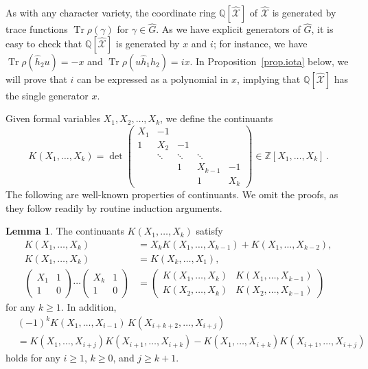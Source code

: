 \documentclass{amsart}
\newcommand{\Q}{\mathbb{Q}}
\newcommand{\Z}{\mathbb{Z}}
\newcommand{\calX}{\mathcal{X}}
\DeclareMathOperator{\Tr}{Tr}
\theoremstyle{definition}
\newtheorem{Lemma}[Theorem]{Lemma}
\begin{document}
As with any character variety, the coordinate ring $\Q[\hat{\calX}]$ of $\hat{\calX}$ is generated by trace functions $\Tr \rho(\gamma)$ for $\gamma\in \hat{G}$. As we have explicit generators of $\hat{G}$, it is easy to check that $\Q[\hat{\calX}]$ is generated by $x$ and $i$; for instance, we have
$\Tr \rho(\hat h_2 u) = -x$ and $\Tr \rho(u \hat h_1\hat h_2) = ix$.
In Proposition~\ref{prop.iota} below, we will prove that $i$ can be expressed as a polynomial in $x$, implying that $\Q[\hat{\calX}]$ has the single generator $x$.

Given formal variables $X_1,X_2,\ldots,X_k$, we define the continuants
\begin{equation*}
K(X_1,\ldots,X_k)=
\det
\begin{pmatrix}
X_1 & -1 &  & & \\
1   & X_2&-1& & \\
    &  \ddots  & \ddots &\ddots &  \\  
    &   & 1&X_{k-1}&-1 \\
    &    &  &1&X_k
\end{pmatrix}  \in \Z[X_1,\ldots,X_k]\,.
\end{equation*}
The following are well-known properties of continuants. We omit the proofs, as they follow readily by routine induction arguments.
\begin{Lemma} 
\label{lem.K}
The continuants $K(X_1,\ldots,X_k)$ satisfy
\begin{align}
     \label{eqn.recursion} K(X_1,\ldots,X_k)&=X_k K(X_1,\ldots,X_{k-1})+K(X_1,\ldots,X_{k-2}) ,\\[2pt]
     \nonumber K(X_1,\ldots,X_k)&=K(X_k,\ldots,X_1) , \\
     \label{eqn.matK} \begin{pmatrix} X_1 & 1 \\ 1 & 0\end{pmatrix}\cdots \begin{pmatrix} X_k & 1 \\ 1 & 0\end{pmatrix} &= \begin{pmatrix} K(X_1,\ldots,X_k) & K(X_1,\ldots,X_{k-1}) \\ K(X_2,\ldots,X_{k}) & K(X_2,\ldots,X_{k-1})\end{pmatrix}
\end{align}
for any $k \geq 1$. In addition, 
\begin{align*}
&(-1)^k K(X_1,\ldots, X_{i-1})\, K(X_{i+k+2},\ldots, X_{i+j})  \\
    & = K(X_1,\ldots,X_{i+j})K(X_{i+1},\ldots,X_{i+k})-K(X_1,\ldots,X_{i+k})K(X_{i+1},\ldots,X_{i+j})
\end{align*}
holds for any $i\ge 1$, $k\ge0$, and  $j\ge k + 1$.
\end{Lemma}
\end{document}
